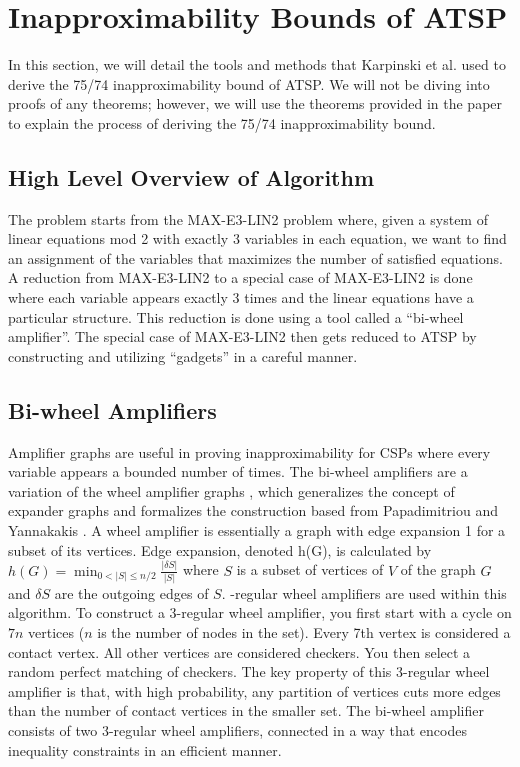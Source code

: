 \documentclass[oneside]{projectpaper} %
\begin{document}
\section{Inapproximability Bounds of ATSP}
In this section, we will detail the tools and methods that Karpinski et al. used to derive the 75/74 inapproximability bound of ATSP. We will not be diving into proofs of any theorems; however, we will use the theorems provided in the paper to explain the process of deriving the 75/74 inapproximability bound.

\subsection{High Level Overview of Algorithm}
The problem starts from the MAX-E3-LIN2 problem where, given a system of linear equations mod 2 with exactly 3 variables in each equation, we want to find an assignment of the variables that maximizes the number of satisfied equations. A reduction from MAX-E3-LIN2 to a special case of MAX-E3-LIN2 is done where each variable appears exactly 3 times and the linear equations have a particular structure. This reduction is done using a tool called a ``bi-wheel amplifier''. The special case of MAX-E3-LIN2 then gets reduced to ATSP by constructing and utilizing ``gadgets'' in a careful manner.

\subsection{Bi-wheel Amplifiers}
Amplifier graphs are useful in proving inapproximability for CSPs where every variable appears a bounded number of times. The bi-wheel amplifiers are a variation of the wheel amplifier graphs \cite{BK01}, which generalizes the concept of expander graphs and formalizes the construction based from Papadimitriou and Yannakakis \cite{PY91}. A wheel amplifier is essentially a graph with edge expansion 1 for a subset of its vertices. Edge expansion, denoted h(G), is calculated by $h(G) = \min_{0 < |S| \leq n/2}\frac{|\delta S|}{|S|}$ where $S$ is a subset of vertices of $V$ of the graph $G$ and $\delta S$ are the outgoing edges of $S$. \newline
{}-regular wheel amplifiers are used within this algorithm. To construct a 3-regular wheel amplifier, you first start with a cycle on $7n$ vertices ($n$ is the number of nodes in the set). Every 7th vertex is considered a contact vertex. All other vertices are considered checkers. You then select a random perfect matching of checkers. The key property of this 3-regular wheel amplifier is that, with high probability, any partition of vertices cuts more edges than the number of contact vertices in the smaller set. The bi-wheel amplifier consists of two 3-regular wheel amplifiers, connected in a way that encodes inequality constraints in an efficient manner.
\end{document}
